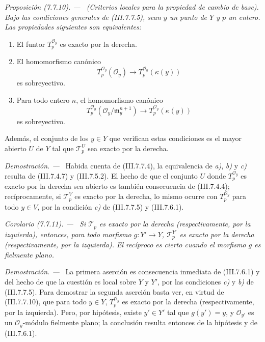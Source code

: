 \documentclass[10pt,oneside]{book}
\newcommand{\kres}{\kappa}
\newcommand{\sref}[2][]{\textup{(#2)}}
\newcommand{\oldpage}[2][]{\setcounter{footnote}{0}\marginpar{\scriptsize\textbf{#1}~|~#2}\ignorespaces}
\newenvironment{proposition}[1][]{\par\medskip\noindent\itshape Proposición (#1). ---\ }{\par}
\newenvironment{corollary}[1][]{\par\medskip\noindent\itshape Corolario (#1). ---\ }{\par}
\newenvironment{proof}{\par\medskip\noindent\textit{Demostración. ---\ }}{\par}
\begin{document}
\begin{proposition}[7.7.10]
\label{III.7.7.10}
\textnormal{(Criterios locales para la propiedad de cambio de base).} Bajo las
condiciones generales de \textup{\sref{III.7.7.5}}, sean $y$ un punto de $Y$ y $p$ un
entero. Las propiedades siguientes son equivalentes:
\begin{enumerate}
  \item[\textup{a)}] El funtor $T_p^{\mathscr O_y}$ es exacto por la derecha.

  \item[\textup{b)}] El homomorfismo canónico
    \[
      T_p^{\mathscr O_y}(\mathscr O_y)
      \longrightarrow
      T_p^{\mathscr O_y}(\kres(y))
    \]
    es sobreyectivo.

  \item[\textup{c)}] Para todo entero $n$, el homomorfismo canónico
    \[
      T_p^{\mathscr O_y}
      (\mathscr O_y/\mathfrak m_y^{n+1})
      \longrightarrow
      T_p^{\mathscr O_y}(\kres(y))
    \]
    es sobreyectivo.
\end{enumerate}
Además, el conjunto de los $y\in Y$ que verifican estas condiciones es el
mayor abierto $U$ de $Y$ tal que $\mathscr T_p^U$ sea exacto por la derecha.
\end{proposition}

\begin{proof}
Habida cuenta de \sref{III.7.7.4}, la equivalencia de \emph{a)}, \emph{b)} y \emph{c)} resulta de
\sref{III.7.4.7} y \sref{III.7.5.2}. El hecho de que el conjunto $U$ donde
$T_p^{\mathscr O_y}$ es exacto por la derecha sea abierto es también
consecuencia de \sref{III.7.4.4}; recíprocamente, si $\mathscr T_p^V$ es exacto
por la derecha, lo mismo ocurre con $T_p^{\mathscr O_y}$ para todo $y\in V$,
por la condición \emph{c)} de \sref{III.7.7.5} y \sref{III.7.6.1}.
\end{proof}

\begin{corollary}[7.7.11]
\label{III.7.7.11}
Si $\mathscr T_p$ es exacto por la derecha \textup{(respectivamente,} por la izquierda\textup{)},
entonces, para todo morfismo $g:Y'\to Y$, $\mathscr T_p^{Y'}$ es exacto por la
derecha \textup{(respectivamente,} por la izquierda\textup{)}. El recíproco es cierto cuando el
morfismo $g$ es fielmente plano.
\end{corollary}

\oldpage[III]{204}
\begin{proof}
La primera aserción es consecuencia inmediata de \sref{III.7.6.1} y del hecho
de que la cuestión es local sobre $Y$ y $Y'$, por las condiciones \emph{c)} y \emph{b)} de
\sref{III.7.7.5}. Para demostrar la segunda aserción basta ver, en virtud de
\sref{III.7.7.10}, que para todo $y\in Y$, $T_p^{\mathscr O_y}$ es exacto por
la derecha (respectivamente, por la izquierda). Pero, por hipótesis, existe
$y'\in Y'$ tal que $g(y')=y$, y $\mathscr O_{y'}$ es un
$\mathscr O_y$-módulo fielmente plano; la conclusión resulta entonces de la
hipótesis y de \sref{III.7.6.1}.
\end{proof}
\end{document}
